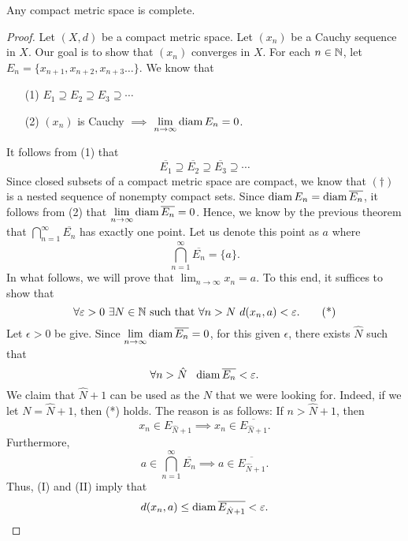 \documentclass[a4paper]{article}
\begin{document}
\begin{theorem}
   Any compact metric space is complete. 
\end{theorem}
\begin{proof}
Let \( (X,d) \) be a compact metric space. Let \( ({x}_{n}) \) be a Cauchy sequence in \( X  \). Our goal is to show that \( ({x}_{n}) \) converges in \( X  \). For each \( n \in \mathbb{N}  \), let \( {E}_{n} =\{  {x}_{n+1}, {x}_{n+2}, {x}_{n+3} \dots  \}  \). We know that 
\begin{enumerate}
    \item[(1)] \( {E}_{1} \supseteq {E}_{2} \supseteq {E}_{3} \supseteq \cdots  \)
    \item[(2)] \( ({x}_{n}) \) is Cauchy \( \implies  \) \( \lim_{ n \to \infty  } \diam {E}_{n} = 0 \).
\end{enumerate}
It follows from (1) that
\[  \overline{{E}_{1}} \supseteq \overline{{E}_{2}} \supseteq \overline{{E}_{3}} \supseteq \cdots \tag{\(\dagger\)} \]
Since closed subsets of a compact metric space are compact, we know that \( (\dagger) \) is a nested sequence of nonempty compact sets. Since \( \operatorname{diam} {E}_{n} = \operatorname{diam} \overline{{E}_{n}} \), it follows from (2) that \( \lim_{ n \to \infty  }  \diam \overline{{E}_{n}} = 0  \). Hence, we know by the previous theorem that \( \bigcap_{ n=1  }^{ \infty  }  \overline{{E}_{n}} \) has exactly one point. Let us denote this point as \( a  \) where
\[  \bigcap_{ n=1 }^{ \infty  } \overline{{E}_{n}} = \{ a \}.  \]
In what follows, we will prove that \( \lim_{ n \to \infty  } {x}_{n} = a  \). To this end, it suffices to show that 
\[  \forall \epsilon > 0 \ \exists N \in \N \ \text{such that} \ \forall n > N \ d({x}_{n},a) < \epsilon. \tag{*} \]
Let \( \epsilon > 0  \) be give. Since \( \lim_{ n \to \infty  }  \diam \overline{{E}_{n}} = 0  \), for this given \( \epsilon \), there exists \( \hat{N} \) such that 
\[  \forall n > \hat{N} \ \ \operatorname{diam} \overline{{E}_{n}} < \varepsilon. \]
We claim that \( \hat{N} + 1 \) can be used as the \( N  \) that we were looking for. Indeed, if we let \( N = \hat{N} + 1 \), then (*) holds. The reason is as follows: If \( n > \hat{N} + 1 \), then
\[  {x}_{n} \in {E}_{\hat{N} + 1} \implies {x}_{n} \in \overline{{E}_{\hat{N} + 1}}. \tag{I} \]
Furthermore, 
\[  a \in \bigcap_{  n = 1  }^{ \infty   }  \overline{{E}_{n}} \implies a \in \overline{{E}_{\hat{N} + 1}}. \tag{II}   \]
Thus, (I) and (II) imply that 
\[  d({x}_{n},a) \leq \operatorname{diam} \overline{{E}_{\hat{N} + 1}} < \varepsilon. \]
\end{proof}
\end{document}
